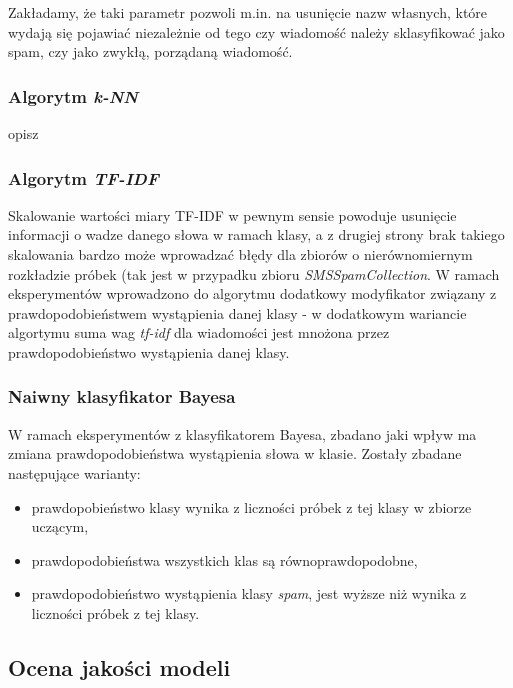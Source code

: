 \documentclass[a4paper,12pt]{article}
\begin{document}
Zakładamy, że taki parametr pozwoli m.in. na usunięcie nazw własnych, które wydają się pojawiać niezależnie od tego czy wiadomość należy sklasyfikować jako spam, czy jako zwykłą, porządaną wiadomość. 

\subsubsection{Algorytm \textit{k-NN}}

opisz

\subsubsection{Algorytm \textit{TF-IDF}}

Skalowanie wartości miary TF-IDF w pewnym sensie powoduje usunięcie informacji o wadze danego słowa w ramach klasy, a z drugiej strony brak takiego skalowania bardzo może wprowadzać błędy dla zbiorów o nierównomiernym rozkładzie próbek (tak jest w przypadku zbioru \textit{SMSSpamCollection}. W ramach eksperymentów wprowadzono do algorytmu dodatkowy modyfikator związany z prawdopodobieństwem wystąpienia danej klasy - w dodatkowym wariancie algortymu suma wag \textit{tf-idf} dla wiadomości jest mnożona przez prawdopodobieństwo wystąpienia danej klasy. 

\subsubsection{Naiwny klasyfikator Bayesa}

W ramach eksperymentów z klasyfikatorem Bayesa, zbadano jaki wpływ ma zmiana prawdopodobieństwa wystąpienia słowa w klasie. Zostały zbadane następujące warianty:

\begin{itemize}
\item prawdopobieństwo klasy wynika z liczności próbek z tej klasy w zbiorze uczącym, 
\item prawdopodobieństwa wszystkich klas są równoprawdopodobne,
\item prawdopodobieństwo wystąpienia klasy \textit{spam}, jest wyższe niż wynika z liczności próbek z tej klasy.
\end{itemize}

\subsection{Ocena jakości modeli} %
\end{document}
